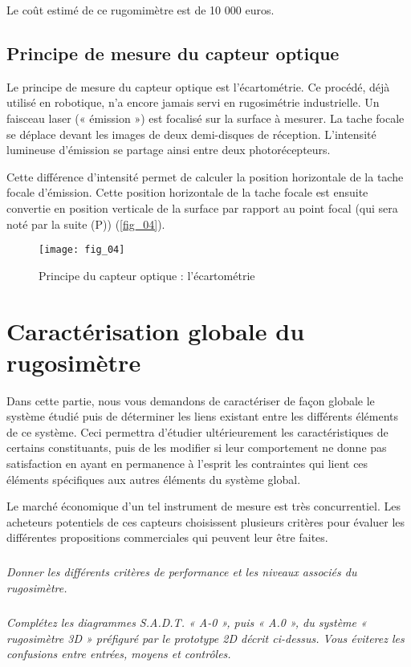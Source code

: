 Le coût estimé de ce rugomimètre est de 10 000 euros.

\subsection{Principe de mesure du capteur optique}

Le principe de mesure du capteur optique est l’écartométrie. Ce procédé, déjà utilisé en robotique, n’a encore jamais servi en rugosimétrie industrielle. Un faisceau laser (« émission ») est focalisé sur la surface à mesurer. La tache focale se déplace devant les images de deux demi-disques de réception. L’intensité lumineuse d’émission se partage ainsi entre deux photorécepteurs.

Cette différence d’intensité permet de calculer la position horizontale de la tache focale d’émission. Cette position horizontale de la tache focale est ensuite convertie en position verticale de la surface par rapport au point focal (qui sera noté par la suite (P)) (\autoref{fig_04}).

\begin{figure}[H]
\centering
\texttt{[image: fig\_04]}
\caption{\label{fig_04} Principe du capteur optique : l’écartométrie}
\end{figure}

\section{Caractérisation globale du rugosimètre}

Dans cette partie, nous vous demandons de caractériser de façon globale le système étudié puis de
déterminer les liens existant entre les différents éléments de ce système. Ceci permettra d’étudier
ultérieurement les caractéristiques de certains constituants, puis de les modifier si leur comportement ne
donne pas satisfaction en ayant en permanence à l’esprit les contraintes qui lient ces éléments spécifiques
aux autres éléments du système global.

Le marché économique d’un tel instrument de mesure est très concurrentiel. Les acheteurs potentiels de ces
capteurs choisissent plusieurs critères pour évaluer les différentes propositions commerciales qui peuvent
leur être faites.



\subparagraph{\label{q_01}}\textit{Donner les différents critères de performance et les niveaux associés du rugosimètre.}

\subparagraph{\label{q_02}}\textit{Complétez les diagrammes S.A.D.T. « A-0 », puis « A.0 », du système « rugosimètre 3D » préfiguré par le prototype 2D décrit ci-dessus. Vous éviterez les confusions entre entrées, moyens et contrôles.}

